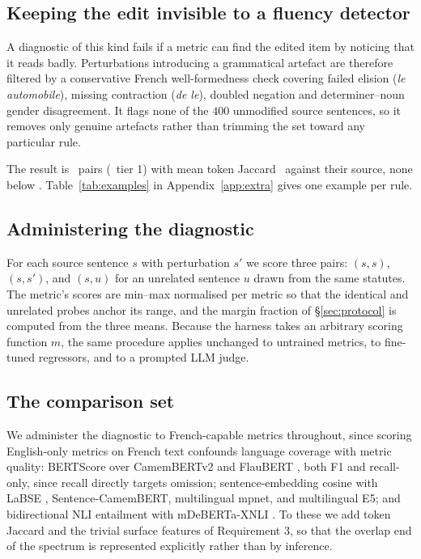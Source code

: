 \documentclass[11pt]{article}
\begin{document}
\subsection{Keeping the edit invisible to a fluency detector}

A diagnostic of this kind fails if a metric can find the edited item by noticing
that it reads badly. Perturbations introducing a grammatical artefact are
therefore filtered by a conservative French well-formedness check covering
failed elision (\emph{le automobile}), missing contraction (\emph{de le}),
doubled negation and determiner--noun gender disagreement. It flags none of the
$400$ unmodified source sentences, so it removes only genuine artefacts rather
than trimming the set toward any particular rule.

The result is \numedits\ pairs (\numeditsTierOne\ tier 1) with mean token
Jaccard \meanjaccard\ against their source, none below \minjaccard.
Table~\ref{tab:examples} in Appendix~\ref{app:extra} gives one example per
rule.


\subsection{Administering the diagnostic}

For each source sentence $s$ with perturbation $s'$ we score three pairs:
$(s,s)$, $(s,s')$, and $(s,u)$ for an unrelated sentence $u$ drawn from the same
statutes. The metric's scores are min--max normalised per metric so that the
identical and unrelated probes anchor its range, and the margin fraction of
\S\ref{sec:protocol} is computed from the three means. Because the harness takes
an arbitrary scoring function $m$, the same procedure applies unchanged to
untrained metrics, to fine-tuned regressors, and to a prompted LLM judge.

\subsection{The comparison set}
\label{sec:metriczoo}

We administer the diagnostic to French-capable metrics throughout, since scoring
English-only metrics on French text confounds language coverage with metric
quality: BERTScore \citep{zhang2019bertscore} over CamemBERTv2
\citep{antoun2024camembert2} and FlauBERT \citep{le2020flaubert}, both F1 and
recall-only, since recall directly targets omission; sentence-embedding cosine
with LaBSE \citep{feng2022labse}, Sentence-CamemBERT, multilingual mpnet, and
multilingual E5; and bidirectional NLI entailment with mDeBERTa-XNLI
\citep{laurer2024nli}. To these we add token Jaccard and the trivial surface
features of Requirement 3, so that the overlap end of the spectrum is
represented explicitly rather than by inference.
\end{document}
